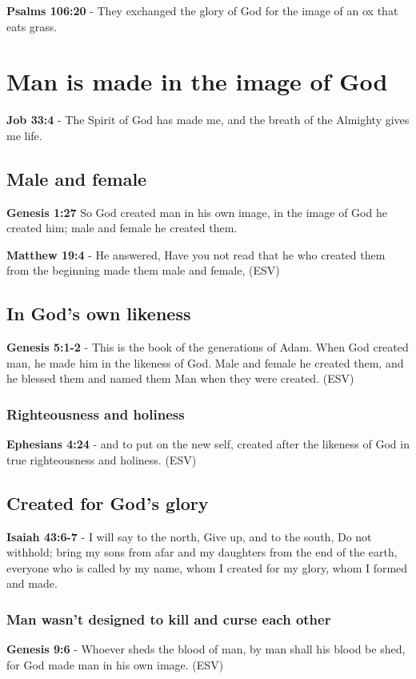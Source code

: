 \documentclass[11pt]{article}
\begin{document}
\textbf{Psalms 106:20} - They exchanged the glory of God for the image of an ox that eats grass.􂉢

\section{Man is made in the image of God}
\label{sec:orgc8b6ff9}
\textbf{Job 33:4} - The Spirit of God has made me, and the breath of the Almighty gives me life.

\subsection{Male and female}
\label{sec:org39cfed0}
\textbf{Genesis 1:27} So God created man in his own image, in the image of God he created him; male and female he created them.

\textbf{Matthew 19:4} - He answered, Have you not read that he who created them from the beginning made them male and female, (ESV)

\subsection{In God's own likeness}
\label{sec:org48252de}
\textbf{Genesis 5:1-2} -  This is the book of the generations of Adam.  When God created man, he made him in the likeness of God.  Male and female he created them, and he blessed them and named them Man when they were created.  (ESV)

\subsubsection{Righteousness and holiness}
\label{sec:org9355a6b}
\textbf{Ephesians 4:24} - and to put on the new self, created after the likeness of God in true righteousness and holiness. (ESV)

\subsection{Created for God's glory}
\label{sec:orgca990a4}
\textbf{Isaiah 43:6-7} - I will say to the north, Give up, and to the south, Do not withhold; bring my sons from afar and my daughters from the end of the earth, everyone who is called by my name, whom I created for my glory, whom I formed and made.

\subsubsection{Man wasn't designed to kill and curse each other}
\label{sec:org7696596}
\textbf{Genesis 9:6} - Whoever sheds the blood of man, by man shall his blood be shed, for God made man in his own image. (ESV)
\end{document}
